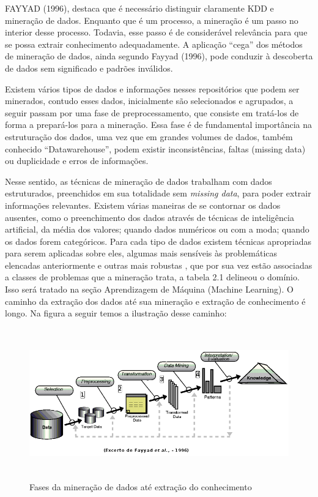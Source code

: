 FAYYAD (1996), destaca que é necessário distinguir claramente KDD e mineração de dados. Enquanto que é um processo, a mineração é um passo no interior desse processo. 
Todavia, esse passo é de considerável relevância para que se possa extrair conhecimento adequadamente. 
A aplicação “cega” dos métodos de mineração de dados, ainda segundo Fayyad (1996), pode conduzir à descoberta de dados sem significado e padrões inválidos. 

Existem vários tipos de dados e informações nesses repositórios que podem ser minerados, contudo esses dados, inicialmente são selecionados e agrupados, a seguir passam por 
uma fase de preprocessamento, que consiste em tratá-los de forma a prepará-los para a mineração. Essa fase é de 
fundamental importância na estruturação dos dados, uma vez que em grandes volumes de dados, também conhecido ``Datawarehouse'', podem existir inconsistências, faltas (missing data) ou 
duplicidade e erros de informações.

Nesse sentido, as técnicas de mineração de dados trabalham com dados estruturados, preenchidos em sua totalidade sem \textit{missing data}, para poder extrair informações relevantes.
Existem várias maneiras de se contornar os dados ausentes, como o preenchimento dos dados através de técnicas de inteligência artificial, da média dos valores; quando dados numéricos 
ou com a moda; quando os dados forem categóricos. Para cada tipo de dados existem técnicas apropriadas para serem aplicadas sobre eles, algumas mais sensíveis às problemáticas elencadas anteriormente
e outras mais robustas \cite{DataMining2}, que por sua vez estão associadas a classes de problemas que a mineração trata, a tabela 2.1 delineou o domínio.
Isso será tratado na seção Aprendizagem de Máquina (Machine Learning).
O caminho da extração dos dados até sua mineração e extração de conhecimento é longo.
Na figura a seguir temos a ilustração desse caminho:

\begin{figure}[!ht]
\centering
\caption{Fases da mineração de dados até extração do conhecimento}
\includegraphics[width=135mm, height=65mm]{Figuras/BigData/FayyadSemFundo.png}
\end{figure}



